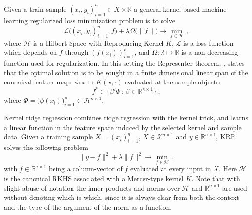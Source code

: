 \documentclass[a4paper,14pt]{extarticle}
\newcommand{\Hcal}{\mathcal{H}}
\newcommand{\Xcal}{\mathcal{X}}
\newcommand{\Real}{\mathbb{R}}
\newcommand{\Lcal}{\mathcal{L}}
\begin{document}
Given a train sample $(x_i, y_i)_{i=1}^n \in X\times \Real$ a general kernel-based
machine learning regularized loss minimization problem is to solve
\begin{equation}
  \Lcal\bigl((x_i, y_i)_{i=1}^n, f\bigr)
    + \lambda \Omega\bigl(\|f\|\bigr)
    \to \min_{f\in \Hcal} \,,
\end{equation}
where $\Hcal$ is a Hilbert Space with Reproducing Kernel $K$, $\Lcal$ is a loss
function which depends on $f$ through $(f(x_i))_{i=1}^n$, and $\Omega:\Real\mapsto\Real$
is a non-decreasing function used for regularization. In this setting the Representer
theorem, \cite{scholkopf2002}, states that the optimal solution is to be sought in a
finite dimensional linear span of the canonical feature maps $\phi: x\mapsto K(x, \cdot)$
evaluated at the sample objects:
\begin{equation*}
  f^* \in \bigl\{ \beta'\Phi\,:\, \beta \in \Real^{n\times 1} \bigr\} \,,
\end{equation*}
where $\Phi = \bigl(\phi(x_i)\bigr)_{i=1}^n \in \Hcal^{n\times 1}$.

Kernel ridge regression combines ridge regression with the kernel trick, and learns
a linear function in the feature space induced by the selected kernel and sample
data. Given a training sample $X = (x_i)_{i=1}^n$, $X\in \Xcal^{n\times 1}$ and
$y \in \Real^{n\times 1}$, KRR solves the following problem
\begin{equation*}
  \|y - f\|^2 + \lambda \|f\|^2 \to \min_{f \in \Hcal} \,,
\end{equation*}
with $f \in \Real^{n\times 1}$ being a column-vector of $f$ evaluated at every input
in $X$. Here $\Hcal$ is the canonical RKHS associated with a Mercer-type kernel $K$.
Note that with slight abuse of notation the inner-products and norms over $\Hcal$
and $\Real^{n\times 1}$ are used without denoting which is which, since it is always
clear from both the context and the type of the argument of the norm as a function.
\end{document}
